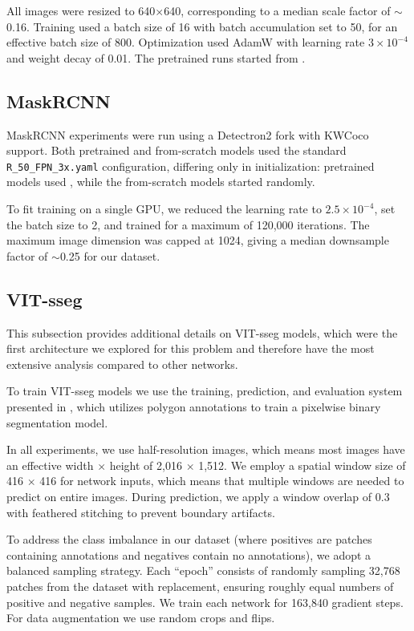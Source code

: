All images were resized to 640$\times$640, corresponding to a median scale factor of $\sim$0.16.
Training used a batch size of 16 with batch accumulation set to 50, for an effective batch size of 800.
Optimization used AdamW with learning rate $3\times10^{-4}$ and weight decay of 0.01.
The pretrained runs started from \YOLOPretrained{}.


\subsection{MaskRCNN}

MaskRCNN experiments were run using a Detectron2 fork with KWCoco support.
Both pretrained and from-scratch models used the standard \texttt{R\_50\_FPN\_3x.yaml} configuration,
  differing only in initialization:
pretrained models used \MaskRCNNPretrained{}, while the from-scratch models started randomly.

To fit training on a single GPU, we reduced the learning rate to $2.5\times10^{-4}$, set the batch size to
  2, and trained for a maximum of 120{,}000 iterations.
The maximum image dimension was capped at 1024, giving a median downsample factor of $\sim$0.25 for our
  dataset.


\subsection{VIT-sseg}
\label{sec:vit_models}

This subsection provides additional details on VIT-sseg models, which were the first architecture we
  explored for this problem and therefore have the most extensive analysis compared to other networks.

To train VIT-sseg models we use the training, prediction, and evaluation system presented in
  \cite{Greenwell_2024_WACV, crall_geowatch_2024}, which utilizes polygon annotations to train a pixelwise
  binary segmentation model.

In all experiments, we use half-resolution images, which means most images have an effective width $\times$
  height of 2,016 $\times$ 1,512.
We employ a spatial window size of 416 $\times$ 416 for network inputs, which means that multiple windows
  are needed to predict on entire images.
During prediction, we apply a window overlap of 0.3 with feathered stitching to prevent boundary artifacts.

To address the class imbalance in our dataset (where positives are patches containing annotations and
  negatives contain no annotations), we adopt a balanced sampling strategy.
Each ``epoch'' consists of randomly sampling 32,768 patches from the dataset with replacement, ensuring
  roughly equal numbers of positive and negative samples.
We train each network for 163,840 gradient steps.
For data augmentation we use random crops and flips.

